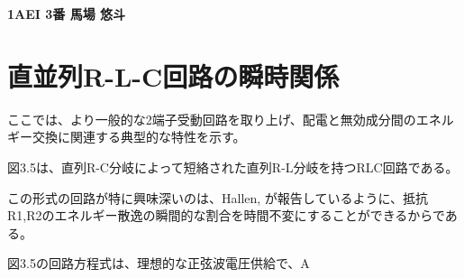 \documentclass[12pt, oneside]{jarticle}
\begin{document}
\vspace*{-1.5cm}  %
\begin{center}
    {\LARGE \textbf{1AEI 3番 馬場 悠斗}}\\[1cm]
\end{center}

\section{直並列R-L-C回路の瞬時関係}
ここでは、より一般的な2端子受動回路を取り上げ、配電と無効成分間のエネルギー交換に関連する典型的な特性を示す。

図3.5は、直列R-C分岐によって短絡された直列R-L分岐を持つRLC回路である。

この形式の回路が特に興味深いのは、Hallen,
が報告しているように、抵抗R1,R2のエネルギー散逸の瞬間的な割合を時間不変にすることができるからである。

図3.5の回路方程式は、理想的な正弦波電圧供給で、A

\newpage

\newpage

\end{document}
